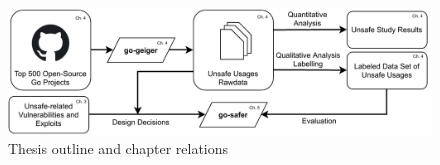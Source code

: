 \begin{figure}[ht]
    \includegraphics[width=\textwidth]{assets/figures/chapter1/outline1.pdf}
    \caption{Thesis outline and chapter relations}
    \label{fig:outline}
\end{figure}
